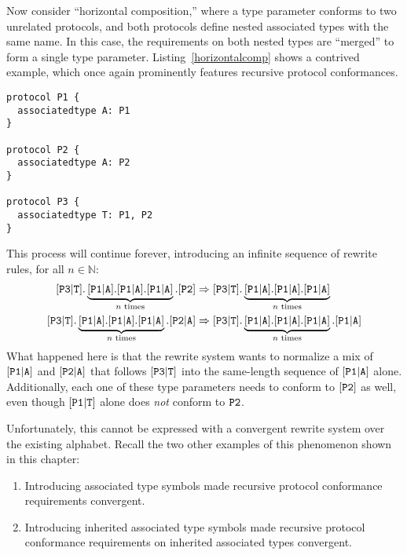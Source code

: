 \documentclass[../generics]{subfiles}
\begin{document}
Now consider ``horizontal composition,'' where a type parameter conforms to two unrelated protocols, and both protocols define nested associated types with the same name. In this case, the requirements on both nested types are ``merged'' to form a single type parameter. Listing~\ref{horizontalcomp} shows a contrived example, which once again prominently features recursive protocol conformances.
\begin{listing}\label{horizontalcomp}
\begin{Verbatim}
protocol P1 {
  associatedtype A: P1
}

protocol P2 {
  associatedtype A: P2
}

protocol P3 {
  associatedtype T: P1, P2
}
\end{Verbatim}
\end{listing}
This process will continue forever, introducing an infinite sequence of rewrite rules, for all $n\in\mathbb{N}$:
\begin{align*}
\assocsym{P3}{T}.\underbrace{\assocsym{P1}{A}.\assocsym{P1}{A}.\assocsym{P1}{A}}_{\text{$n$ times}}.\protosym{P2}&\Rightarrow \assocsym{P3}{T}.\underbrace{\assocsym{P1}{A}.\assocsym{P1}{A}.\assocsym{P1}{A}}_{\text{$n$ times}}\\
\assocsym{P3}{T}.\underbrace{\assocsym{P1}{A}.\assocsym{P1}{A}.\assocsym{P1}{A}}_{\text{$n$ times}}.\assocsym{P2}{A}&\Rightarrow \assocsym{P3}{T}.\underbrace{\assocsym{P1}{A}.\assocsym{P1}{A}.\assocsym{P1}{A}}_{\text{$n$ times}}.\assocsym{P1}{A}
\end{align*}
What happened here is that the rewrite system wants to normalize a mix of $[\texttt{P1}|\texttt{A}]$ and $[\texttt{P2}|\texttt{A}]$ that follows $[\texttt{P3}|\texttt{T}]$ into the same-length sequence of $[\texttt{P1}|\texttt{A}]$ alone. Additionally, each one of these type parameters needs to conform to $[\texttt{P2}]$ as well, even though $[\texttt{P1}|\texttt{T}]$ alone does \emph{not} conform to $\texttt{P2}$.

Unfortunately, this cannot be expressed with a convergent rewrite system over the existing alphabet. Recall the two other examples of this phenomenon shown in this chapter:
\begin{enumerate}
\item Introducing associated type symbols made recursive protocol conformance requirements convergent.
\item Introducing inherited associated type symbols made recursive protocol conformance requirements on inherited associated types convergent.
\end{enumerate}
\end{document}
